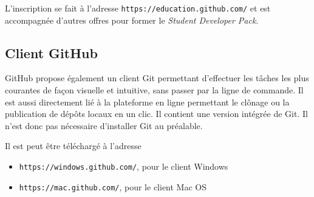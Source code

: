 \documentclass[11pt,a4paper]{article}
\begin{document}
L'inscription se fait à l'adresse {\tt https://education.github.com/} et est accompagnée d'autres offres pour former le {\it Student Developer Pack}.

\subsection{Client GitHub}

GitHub propose également un client Git permettant d'effectuer les tâches les plus courantes de façon visuelle et intuitive, sans passer par la ligne de commande.
Il est aussi directement lié à la plateforme en ligne permettant le clônage ou la publication de dépôts locaux en un clic.
Il contient une version intégrée de Git. Il n'est donc pas nécessaire d'installer Git au préalable.

Il est peut être téléchargé à l'adresse

\begin{itemize}
	\item {\tt https://windows.github.com/}, pour le client Windows
	\item {\tt https://mac.github.com/}, pour le client Mac OS
\end{itemize}

%
\end{document}
